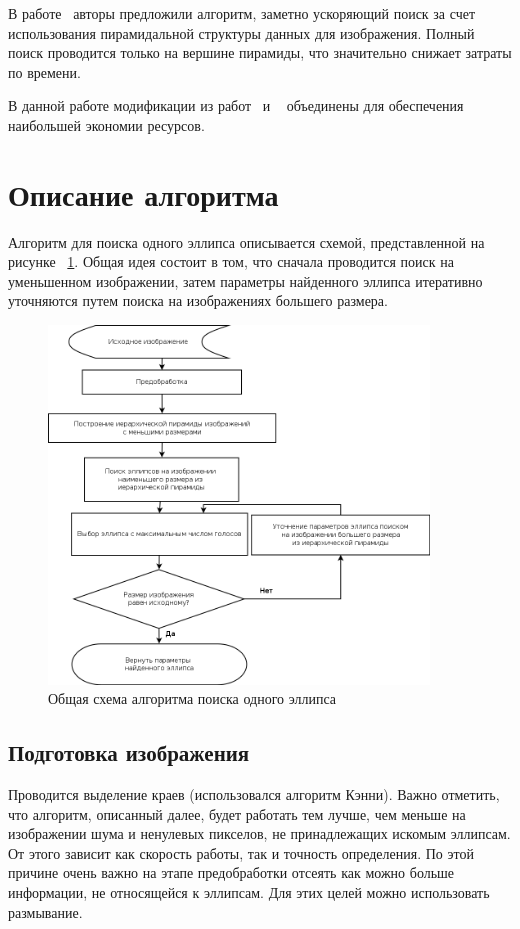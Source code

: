 В работе~\autocite{Chien} авторы предложили алгоритм, заметно ускоряющий поиск за счет использования пирамидальной структуры данных для изображения. 
Полный поиск проводится только на вершине пирамиды, что значительно снижает затраты по времени.

В данной работе модификации из работ~\autocite{OneDim} и ~\autocite{Chien} объединены для обеспечения наибольшей экономии ресурсов.

\section{Описание алгоритма}
Алгоритм для поиска одного эллипса описывается схемой, представленной на рисунке ~\ref{fig:oneellipse}. 
Общая идея состоит в том, что сначала проводится поиск на уменьшенном изображении, затем параметры найденного эллипса итеративно уточняются путем поиска на изображениях большего размера.
\begin{figure}
\centering
\caption{\label{fig:oneellipse} Общая схема алгоритма поиска одного эллипса}
\includegraphics[width=0.9\textwidth]{img/oneellipse.png}
\end{figure}
\subsection{Подготовка изображения}
Проводится выделение краев (использовался алгоритм Кэнни). Важно отметить, что алгоритм, описанный далее, будет работать тем лучше, чем меньше на изображении шума и ненулевых пикселов,
не принадлежащих искомым эллипсам. От этого зависит как скорость работы, так и точность определения. 
По этой причине очень важно на этапе предобработки отсеять как можно больше информации, не относящейся к эллипсам. Для этих целей можно использовать размывание.

